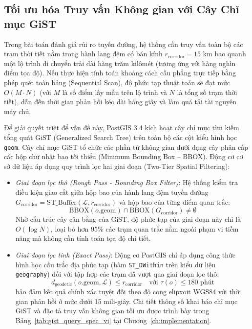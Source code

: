 \subsection{Tối ưu hóa Truy vấn Không gian với Cây Chỉ mục GiST}
Trong bài toán đánh giá rủi ro tuyến đường, hệ thống cần truy vấn toàn bộ các trạm thời tiết nằm trong hành lang đệm có bán kính $r_{\text{corridor}} = 15\text{ km}$ bao quanh một lộ trình di chuyển trải dài hàng trăm kilômét (tương ứng với hàng nghìn điểm tọa độ). Nếu thực hiện tính toán khoảng cách cầu phẳng trực tiếp bằng phép quét toàn bảng (Sequential Scan), độ phức tạp thuật toán sẽ đạt mức $O(M \cdot N)$ (với $M$ là số điểm lấy mẫu trên lộ trình và $N$ là tổng số trạm thời tiết), dẫn đến thời gian phản hồi kéo dài hàng giây và làm quá tải tài nguyên máy chủ.

Để giải quyết triệt để vấn đề này, PostGIS 3.4 kích hoạt cây chỉ mục tìm kiếm tổng quát GiST (Generalized Search Tree) trên toàn bộ các cột kiểu hình học \texttt{geom}. Cây chỉ mục GiST tổ chức các phần tử không gian dưới dạng cây phân cấp các hộp chữ nhật bao tối thiểu (Minimum Bounding Box -- BBOX). Động cơ cơ sở dữ liệu áp dụng quy trình lọc hai giai đoạn (Two-Tier Spatial Filtering):
\begin{itemize}
    \item[-] \textit{Giai đoạn lọc thô (Rough Pass - Bounding Box Filter)}: Hệ thống kiểm tra điều kiện giao cắt giữa hộp bao của hành lang đệm tuyến đường $G_{\text{corridor}} = \text{ST\_Buffer}(\mathcal{L}, r_{\text{corridor}})$ và hộp bao của từng điểm quan trắc:
    \begin{equation}
    \label{eq:spatial_bbox_filter_vi}
    \text{BBOX}(o.\text{geom}) \cap \text{BBOX}(G_{\text{corridor}}) \ne \emptyset
    \end{equation}
    Nhờ cấu trúc cây cân bằng của GiST, độ phức tạp của giai đoạn này chỉ là $O(\log N)$, loại bỏ hơn 95\% các trạm quan trắc nằm ngoài phạm vi tiềm năng mà không cần tính toán tọa độ chi tiết.
    \item[-] \textit{Giai đoạn lọc tinh (Exact Pass)}: Động cơ PostGIS chỉ áp dụng công thức hình học cầu trắc địa phức tạp (hàm \texttt{ST\_DWithin} trên kiểu dữ liệu \texttt{geography}) đối với tập hợp các trạm đã vượt qua giai đoạn lọc thô:
    \begin{equation}
    \label{eq:spatial_exact_filter_vi}
    d_{\text{geodetic}}(o.\text{geom}, \mathcal{L}) \le r_{\text{corridor}} \quad \text{với } \tau(o) \le 180\text{ phút}
    \end{equation}
    bảo đảm kết quả chính xác tuyệt đối theo độ cong elipxoit WGS84 với thời gian phản hồi ở mức dưới 15 mili-giây. Chi tiết thông số khai báo chỉ mục GiST và đặc tả truy vấn không gian tối ưu được trình bày trong Bảng~\ref{tab:gist_query_spec_vi} tại Chương~\ref{ch:implementation}.
\end{itemize}

